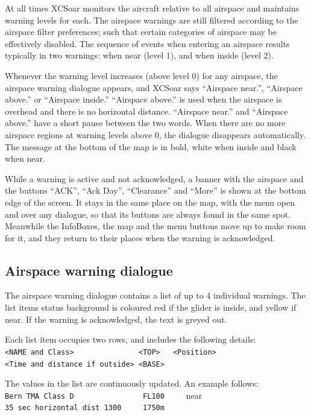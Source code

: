 At all times XCSoar monitors the aircraft relative to all airspace and
maintains warning levels for each.  The airspace warnings are still
filtered according to the airspace filter preferences; such that
certain categories of airspace may be effectively disabled.
The sequence of events when entering an airspace results typically
in two warnings: when near (level 1), and when inside (level 2).

Whenever the warning level increases (above level 0) for any airspace,
the airspace warning dialogue appears, and XCSoar says ``Airspace
near.'', ``Airspace above.'' or ``Airspace inside.'' ``Airspace
above.'' is used when the airspace is overhead and there is no
horizontal distance. ``Airspace near.'' and ``Airspace above.'' have
a short pause between the two words.
When there are no more airspace regions at warning levels above
0, the dialogue disappears automatically.  The message at the bottom
of the map is in bold, white when inside and black when near.

While a warning is active and not acknowledged, a banner with the
airspace and the buttons ``ACK'', ``Ack Day'', ``Clearance'' and
``More'' is shown at the bottom edge of the screen.  It stays in the
same place on the map, with the menu open and over any dialogue, so
that its buttons are always found in the same spot.  Meanwhile the
InfoBoxes, the map and the menu buttons move up to make room for it,
and they return to their places when the warning is acknowledged.


\subsection*{Airspace warning dialogue}

The airspace warning dialogue contains a list of up to 4 individual
warnings.  The list items status background is coloured red if the glider is
inside, and yellow if near.  If the warning is acknowledged, the
text is greyed out.

Each list item occupies two rows, and includes the following details:\\
\verb+<NAME and Class>               <TOP>   <Position>+\\
\verb+<Time and distance if outside> <BASE>+

The values in the list are continuously updated. 
An example follows:\\
\verb+Bern TMA Class D                FL100     +\colorbox{AirspaceYellow}{near}\\
\verb+35 sec horizontal dist 1300     1750m+

